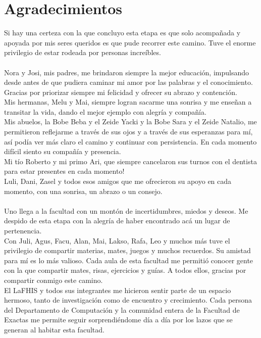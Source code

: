 \chapter*{Agradecimientos}

\noindent Si hay una certeza con la que concluyo esta etapa es que solo acompañada y apoyada por mis seres queridos es que pude recorrer este camino. Tuve el enorme privilegio de estar rodeada por personas increíbles.
\\
\\
\noindent Nora y Josi, mis padres, me brindaron siempre la mejor educación, impulsando desde antes de que pudiera caminar mi amor por las palabras y el conocimiento. Gracias por priorizar siempre mi felicidad y ofrecer su abrazo y contención.
\\
\noindent Mis hermanas, Melu y Mai, siempre logran sacarme una sonrisa y me enseñan a transitar la vida, dando el mejor ejemplo con alegría y compañía.
\\
\noindent Mis abuelos, la Bobe Beba y el Zeide Yacki y la Bobe Sara y el Zeide Natalio, me permitieron reflejarme a través de sus ojos y  a través de sus esperanzas para mí, así podía ver más claro el camino y continuar con persistencia. En cada momento difícil siento su compañía y presencia.
\\
\noindent Mi tío Roberto y mi primo Ari, que siempre cancelaron sus turnos con el dentista para estar presentes en cada momento!
\\
\noindent Luli, Dani, Zasel y todos esos amigos que me ofrecieron su apoyo en cada momento, con una sonrisa, un abrazo o un consejo.
\\
\\
\noindent Uno llega a la facultad con un montón de incertidumbres, miedos y deseos. Me despido de esta etapa con la alegría de haber encontrado acá un lugar de pertenencia.
\\
\noindent Con Juli, Agus, Facu, Alan, Mai, Lakso, Rafa, Leo y muchos más tuve el privilegio de compartir materias, mates, juegos y muchos recuerdos. Su amistad para mí es lo más valioso. Cada aula de esta facultad me permitió conocer gente con la que compartir mates, risas, ejercicios y guías. A todos ellos, gracias por compartir conmigo este camino.
\\
\noindent El LaFHIS y todos sus integrantes me hicieron sentir parte de un espacio hermoso, tanto de investigación como de encuentro y crecimiento. Cada persona del Departamento de Computación y la comunidad entera de la Facultad de Exactas me permite seguir sorprendiéndome día a día por los lazos que se generan al habitar esta facultad. 
